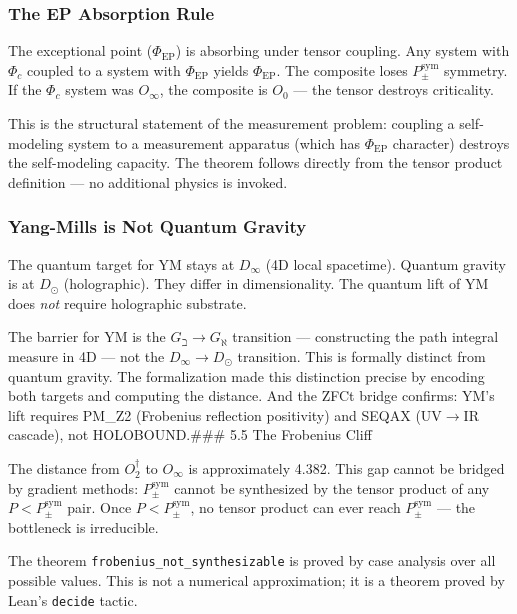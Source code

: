 \documentclass[12pt,a4paper]{article}
\begin{document}
\subsubsection{The EP Absorption Rule}

The exceptional point ($\Phi_{\text{EP}}$) is absorbing under tensor coupling. Any system with $\Phi_c$ coupled to a system with $\Phi_{\text{EP}}$ yields $\Phi_{\text{EP}}$. The composite loses $P_{\pm}^{\text{sym}}$ symmetry. If the $\Phi_c$ system was $O_{\infty}$, the composite is $O_0$ --- the tensor destroys criticality.

This is the structural statement of the measurement problem: coupling a self-modeling system to a measurement apparatus (which has $\Phi_{\text{EP}}$ character) destroys the self-modeling capacity. The theorem follows directly from the tensor product definition --- no additional physics is invoked.

\subsubsection{Yang-Mills is Not Quantum Gravity}

The quantum target for YM stays at $D_{\infty}$ (4D local spacetime). Quantum gravity is at $D_{\odot}$ (holographic). They differ in dimensionality. The quantum lift of YM does \emph{not} require holographic substrate.

The barrier for YM is the $G_{\beth} \to G_{\aleph}$ transition --- constructing the path integral measure in 4D --- not the $D_{\infty} \to D_{\odot}$ transition. This is formally distinct from quantum gravity. The formalization made this distinction precise by encoding both targets and computing the distance. And the ZFCt bridge confirms: YM's lift requires PM\_Z2 (Frobenius reflection positivity) and SEQAX (UV$\rightarrow$IR cascade), not HOLOBOUND.\#\#\# 5.5 The Frobenius Cliff

The distance from $O_2^\dagger$ to $O_{\infty}$ is approximately 4.382. This gap cannot be bridged by gradient methods: $P_{\pm}^{\text{sym}}$ cannot be synthesized by the tensor product of any $P < P_{\pm}^{\text{sym}}$ pair. Once $P < P_{\pm}^{\text{sym}}$, no tensor product can ever reach $P_{\pm}^{\text{sym}}$ --- the bottleneck is irreducible.

The theorem \texttt{frobenius\_not\_synthesizable} is proved by case analysis over all possible values. This is not a numerical approximation; it is a theorem proved by Lean's \texttt{decide} tactic.
\end{document}

